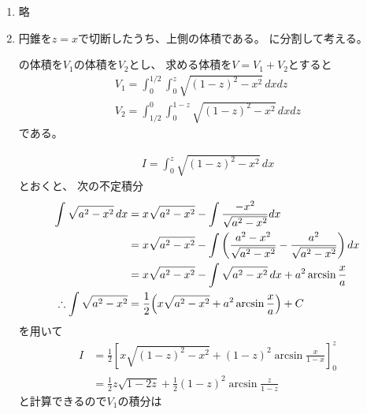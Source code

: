 \begin{enumerate}[label=(\arabic*)]
  \item 略%
  \item 円錐を$z=x$で切断したうち、上側の体積である。
  に分割して考える。

  の体積を$V_1$の体積を$V_2$とし、
  求める体積を$V = V_1 + V_2$とすると
  \begin{gather}
    V_1 = \int_{0}^{1/2}\int_{0}^{z}\sqrt{(1-z)^2 - x^2} \,dxdz \\
    V_2 = \int_{1/2}^{0}\int_{0}^{1-z}\sqrt{(1-z)^2 - x^2} \,dxdz
  \end{gather}
  である。

  \begin{align}
    I = \int_{0}^{z}\sqrt{(1-z)^2 - x^2} \,dx
  \end{align}
  とおくと、
  次の不定積分
    \begin{align}
      \int \sqrt{a^2 - x^2} \,dx
      &= x\sqrt{a^2 - x^2} - \int\frac{-x^2}{\sqrt{a^2 - x^2}}dx \\
      &= x\sqrt{a^2 - x^2}
      - \int \left(\frac{a^2-x^2}{\sqrt{a^2 - x^2}} - \frac{a^2}{\sqrt{a^2 - x^2}}\right) dx \\
      &= x\sqrt{a^2 - x^2}
      - \int \sqrt{a^2 - x^2} \,dx + a^2\arcsin\frac{x}{a} \\
      \therefore
      \int\sqrt{a^2 - x^2} &= \frac{1}{2}\Bigl(x\sqrt{a^2 - x^2} + a^2\arcsin\frac{x}{a}\Bigr) + C
    \end{align}
  を用いて
  \begin{align}
    I
    &= \frac{1}{2}\left[x\sqrt{(1-z)^2 - x^2} + (1-z)^2\arcsin \frac{x}{1-x}\right]_{0}^{z} \\
    &= \frac{1}{2} z\sqrt{1-2z} + \frac{1}{2}(1-z)^2 \arcsin \frac{z}{1-z}
  \end{align}
  と計算できるので$V_1$の積分は


\end{enumerate}
